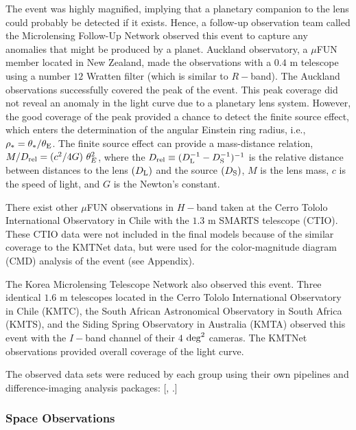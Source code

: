 \documentclass[10pt]{emulateapj}
\begin{document}
 The event was highly magnified, implying that a planetary companion to the lens could probably 
be detected if it exists. Hence, a follow-up observation team called the Microlensing Follow-Up 
Network \citep[$\mu$FUN:][]{gould06} observed this event to capture any anomalies that might be 
produced by a planet. Auckland observatory, a $\mu$FUN member located in New Zealand, made the 
observations with a $0.4$ m telescope using a number $12$ Wratten filter (which is similar to $R-$band). 
The Auckland observations successfully covered the peak of the event. This peak coverage did not 
reveal an anomaly in the light curve due to a planetary lens system. However, the good coverage 
of the peak provided a chance to detect the finite source effect, which enters the determination of
the angular Einstein ring radius, i.e., $\rho_{\ast}=\theta_{\ast}/\theta_{\rm E}$.
The finite source effect can provide a mass-distance relation, $M/D_{\rm rel}=(c^2/4G)~\theta_E^2$, 
where the $D_{\rm rel}\equiv(D_{\rm L}^{-1}-D_{\rm S}^{-1})^{-1}$ is the relative distance between distances 
to the lens $(D_{\rm L})$ and the source $(D_{\rm S})$, $M$ is the lens mass, $c$ is the speed of light, 
and $G$ is the Newton's constant.


 There exist other $\mu$FUN observations in $H-$band taken at the Cerro Tololo International Observatory 
in Chile with the $1.3$ m SMARTS telescope (CTIO). These CTIO data were not included in the final models 
because of the similar coverage to the KMTNet data, but were used for the color-magnitude diagram 
(CMD) analysis of the event (see Appendix).

 The Korea Microlensing Telescope Network \citep[KMTNet:][]{kim16} also observed this event. Three identical 
$1.6$ m telescopes located in the Cerro Tololo International Observatory in Chile (KMTC), the South African 
Astronomical Observatory in South Africa (KMTS), and the Siding Spring Observatory in Australia (KMTA) 
observed this event with the $I-$band channel of their $4$ ${\rm deg}^{2}$ cameras. The KMTNet observations 
provided overall coverage of the light curve.

 The observed data sets were reduced by each group using their own pipelines and difference-imaging 
analysis packages: [\citep[OGLE-IV (DIA):][]{alard98,wozniak00}, \citep[$\mu$FUN and KMTNet (pySIS):]
[]{albrow09}.] 

\subsubsection{Space Observations}
\end{document}
